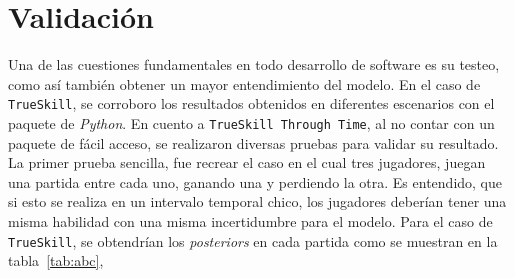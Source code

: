 \documentclass[11pt,twoside, spanish]{report} %
\begin{document}
\section{Validaci\'on}

Una de las cuestiones fundamentales en todo desarrollo de software es su testeo, como as\'i tambi\'en obtener un mayor entendimiento del modelo.
En el caso de \texttt{TrueSkill}, se corroboro los resultados obtenidos en diferentes escenarios con el paquete de \textit{Python}.
En cuento a \texttt{TrueSkill Through Time}, al no contar con un paquete de f\'acil acceso, se realizaron diversas pruebas para validar su resultado.
La primer prueba sencilla, fue recrear el caso en el cual tres jugadores, juegan una partida entre cada uno, ganando una y perdiendo la otra.
Es entendido, que si esto se realiza en un intervalo temporal chico, los jugadores deber\'ian tener una misma habilidad con una misma incertidumbre para el modelo.
Para el caso de \texttt{TrueSkill}, se obtendr\'ian los \textit{posteriors} en cada partida como se muestran en la tabla~\ref{tab:abc},

\begin{table}[H]
\centering
{}
\caption{\textit{Posteriors} de 3 partidas utilizando \texttt{TrueSkill}, con jugadores inicializados con una media de 25 y una incertidumbre de 6. Se recuadra en celeste el \textit{posterior} final de cada jugador.}
\label{tab:abc}
\end{table}
\end{document}
